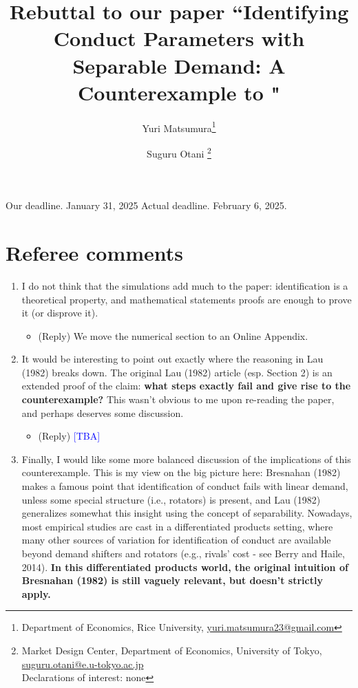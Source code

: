 \documentclass[11pt, a4paper]{article}
\title{Rebuttal to our paper ``Identifying Conduct Parameters with Separable Demand: A Counterexample to \cite{lau1982identifying}"}
\author{Yuri Matsumura\thanks{Department of Economics, Rice University, \href{mailto:}{yuri.matsumura23@gmail.com}} \and Suguru Otani \thanks{Market Design Center, Department of Economics, University of Tokyo, \href{mailto:}{suguru.otani@e.u-tokyo.ac.jp}
\\Declarations of interest: none %
}}
\theoremstyle{remark}
\begin{document}
\maketitle

\bigskip

Our deadline. January 31, 2025
Actual deadline. February 6, 2025.

\section{Referee comments}
\begin{enumerate}
    \item I do not think that the simulations add much to the paper: identification is a theoretical property, and mathematical statements proofs are enough to prove it (or disprove it).
    \begin{itemize}
        \item (Reply) We move the numerical section to an Online Appendix.
    \end{itemize}
    \item It would be interesting to point out exactly where the reasoning in Lau (1982) breaks down. The original Lau (1982) article (esp. Section 2) is an extended proof of the claim: \textbf{what steps exactly fail and give rise to the counterexample?} This wasn't obvious to me upon re-reading the paper, and perhaps deserves some discussion.
    \begin{itemize}
        \item (Reply) \textcolor{blue}{[TBA]}%
    \end{itemize}
    \item Finally, I would like some more balanced discussion of the implications of this counterexample. 
    This is my view on the big picture here: Bresnahan (1982) makes a famous point that identification of conduct fails with linear demand, unless some special structure (i.e., rotators) is present, and Lau (1982) generalizes somewhat this insight using the concept of separability.
    Nowadays, most empirical studies are cast in a differentiated products setting, where many other sources of variation for identification of conduct are available beyond demand shifters and rotators (e.g., rivals' cost - see Berry and Haile, 2014).
    \textbf{In this differentiated products world, the original intuition of Bresnahan (1982) is still vaguely relevant, but doesn't strictly apply.}
    

\end{enumerate}
\end{document}

